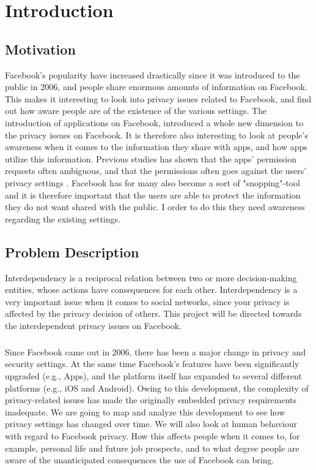 \chapter{Introduction}
\label{chp:introduction} 

\section{Motivation}
Facebook's popularity have increased drastically since it was introduced to the public in 2006, and people share enormous amounts of information on Facebook. This makes it interesting to look into privacy issues related to Facebook, and find out how aware people are of the existence of the various settings. The introduction of applications on Facebook, introduced a whole new dimension to the privacy issues on Facebook. It is therefore also interesting to look at people's awareness when it comes to the information they share with apps, and how apps utilize this information. Previous studies has shown that the apps' permission requests often ambiguous, and that the permissions often goes against the users' privacy settings \cite{thirdPartyApps}. Facebook has for many also become a sort of "snopping"-tool and it is therefore important that the users are able to protect the information they do not want shared with the public. I order to do this they need awareness regarding the existing settings. 


\section{Problem Description}
Interdependency is a reciprocal relation between two or more decision-making entities, whose actions have consequences for each other. Interdependency is a very important issue when it comes to social networks, since your privacy is affected by the privacy decision of others. This project will be directed towards the interdependent privacy issues on Facebook.
\paragraph{}
Since Facebook came out in 2006, there has been a major change in privacy and security settings. At the same time Facebook's features have been significantly upgraded (e.g., Apps), and the platform itself has expanded to several different platforms (e.g., iOS and Android). Owing to this development, the complexity of privacy-related issues has made the originally embedded privacy requirements inadequate. We are going to map and analyze this development to see how privacy settings has changed over time. We will also look at human behaviour with regard to Facebook privacy. How this affects people when it comes to, for example, personal life and future job prospects, and to what degree people are aware of the unanticipated consequences the use of Facebook can bring.
